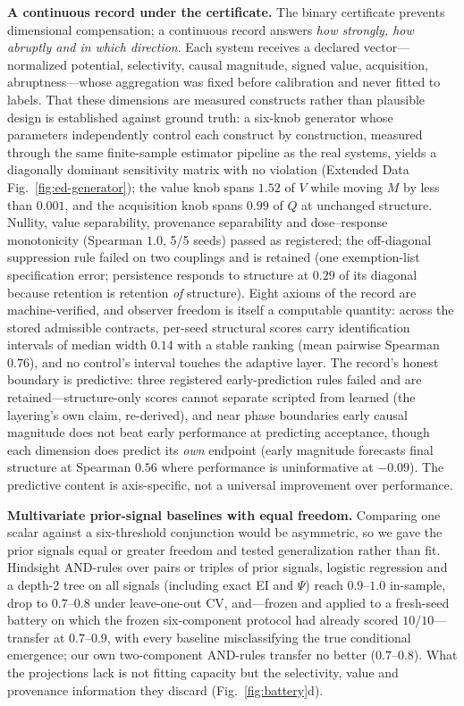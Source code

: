 \documentclass[11pt]{article}
\theoremstyle{definition}
\begin{document}
\textbf{A continuous record under the certificate.}
The binary certificate prevents dimensional compensation; a continuous
record answers \emph{how strongly, how abruptly and in which
direction}. Each system receives a declared vector---normalized
potential, selectivity, causal magnitude, signed value, acquisition,
abruptness---whose aggregation was fixed before calibration and never
fitted to labels. That these dimensions are measured constructs rather
than plausible design is established against ground truth: a
six-knob generator whose parameters independently control each
construct by construction, measured through the same finite-sample
estimator pipeline as the real systems, yields a diagonally dominant
sensitivity matrix with no violation (Extended Data
Fig.~\ref{fig:ed-generator}); the value knob spans $1.52$ of $V$ while
moving $M$ by less than $0.001$, and the acquisition knob spans $0.99$
of $Q$ at unchanged structure. Nullity, value separability, provenance
separability and dose--response monotonicity (Spearman $1.0$, 5/5
seeds) passed as registered; the off-diagonal suppression rule failed
on two couplings and is retained (one exemption-list specification
error; persistence responds to structure at $0.29$ of its diagonal
because retention is retention \emph{of} structure). Eight axioms of
the record are machine-verified, and observer freedom is itself a
computable quantity: across the stored admissible contracts, per-seed
structural scores carry identification intervals of median width
$0.14$ with a stable ranking (mean pairwise Spearman $0.76$), and no
control's interval touches the adaptive layer. The record's honest
boundary is predictive: three registered early-prediction rules failed
and are retained---structure-only scores cannot separate scripted from
learned (the layering's own claim, re-derived), and near phase
boundaries early causal magnitude does not beat early performance at
predicting acceptance, though each dimension does predict its
\emph{own} endpoint (early magnitude forecasts final structure at
Spearman $0.56$ where performance is uninformative at $-0.09$). The
predictive content is axis-specific, not a universal improvement over
performance.

\textbf{Multivariate prior-signal baselines with equal freedom.}
Comparing one scalar against a six-threshold conjunction would be
asymmetric, so we gave the prior signals equal or greater freedom and
tested generalization rather than fit. Hindsight AND-rules over pairs
or triples of prior signals, logistic regression and a depth-2 tree on
all signals (including exact EI and $\Psi$) reach $0.9$--$1.0$
in-sample, drop to $0.7$--$0.8$ under leave-one-out CV, and---frozen
and applied to a fresh-seed battery on which the frozen six-component
protocol had already scored $10/10$---transfer at $0.7$--$0.9$, with
every baseline misclassifying the true conditional emergence; our own
two-component AND-rules transfer no better ($0.7$--$0.8$). What the
projections lack is not fitting capacity but the selectivity, value
and provenance information they discard (Fig.~\ref{fig:battery}d).
\end{document}
